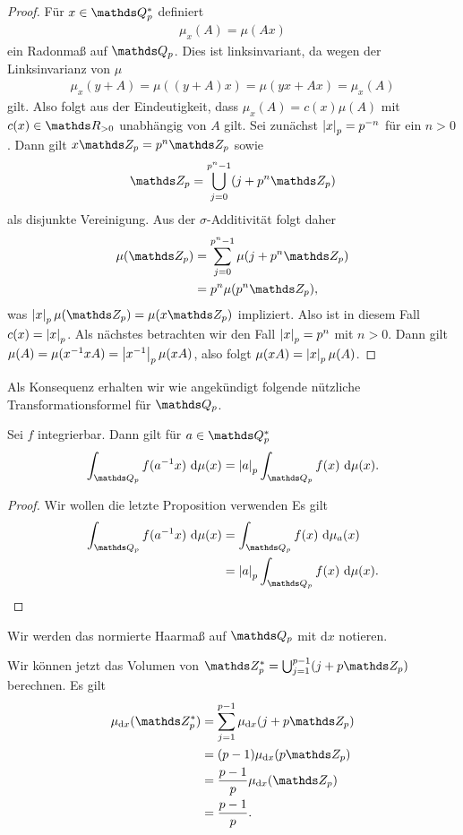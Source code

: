 \begin{proof}
Für $x \in \Q_p^\ast$ definiert
\begin{align*}
\mu_x(A)=\mu(Ax)
\end{align*}
ein Radonmaß auf $\Q_p$.
Dies ist linksinvariant, da wegen der Linksinvarianz von $\mu$
\begin{align*}
\mu_x(y+A)=\mu((y+A)x)=\mu(yx+Ax)=\mu_x(A)
\end{align*}
gilt.
Also folgt aus der Eindeutigkeit, dass $\mu_x(A)=c(x)\mu(A)$ mit $c(x)\in \R_{> 0}$ unabhängig von $A$ gilt.
Sei zunächst $\left\vert x\right\vert_p=p^{-n}$ für ein $n>0$.
Dann gilt $x\Z_p=p^n\Z_p$ sowie 
\begin{align*}
\Z_p=\bigcup_{j=0}^{p^n-1}(j+p^n\Z_p)
\end{align*}
als disjunkte Vereinigung.
Aus der $\sigma$-Additivität folgt daher
\begin{align*}
\mu(\Z_p)&=\sum_{j=0}^{p^n-1} \mu(j+p^n\Z_p)\\
&=p^n \mu(p^n \Z_p),
\end{align*}
was $\abs{x}_p\mu(\Z_p)=\mu(x\Z_p)$ impliziert.
Also ist in diesem Fall $c(x)=\left\vert x\right\vert_p$.
Als nächstes betrachten wir den Fall $\left\vert x\right\vert_p=p^n$ mit $n>0$.
Dann gilt
$\mu(A)=\mu(x^{-1}xA)=\left\vert x^{-1}\right\vert_p\mu(xA)$,
also folgt $\mu(xA)=\left\vert x\right\vert_p\mu(A)$.
\end{proof}

Als Konsequenz erhalten wir wie angekündigt folgende nützliche Transformationsformel für $\Q_p$.

\begin{cor}
Sei $f$ integrierbar. Dann gilt für $a \in \Q_p^\ast$
\begin{align*}
\int_{\Q_p}f(a^{-1}x)~\mathrm{d}\mu(x)=\abs{a}_p\int_{\Q_p}f(x)~\mathrm{d}\mu(x).
\end{align*}
\end{cor}
\begin{proof}
Wir wollen die letzte Proposition verwenden
Es gilt 
\begin{align*}
\int_{\Q_p}f(a^{-1}x)~\mathrm{d}\mu(x)&=\int_{\Q_p} f(x)~\mathrm{d}\mu_a(x)\\
&=\abs{a}_p \int_{\Q_p} f(x)~\mathrm{d}\mu(x). \qedhere
\end{align*}
\end{proof}
Wir werden das normierte Haarmaß auf $\Q_p$ mit $\mathrm{d}x$ notieren.


\begin{bsp}
Wir können jetzt das Volumen von $\Z_p^\ast=\bigcup_{j=1}^{p-1}(j+p\Z_p)$ berechnen.
Es gilt
\begin{align*}
\mu_{\mathrm{d}x}(\Z_p^\ast)&=\sum_{j=1}^{p-1} \mu_{\mathrm{d}x}(j+p\Z_p)\\
&=(p-1)\mu_{\mathrm{d}x}(p \Z_p)\\
&=\frac{p-1}{p}\mu_{\mathrm{d}x}(\Z_p)\\
&=\frac{p-1}{p}.
\end{align*}
\end{bsp}

